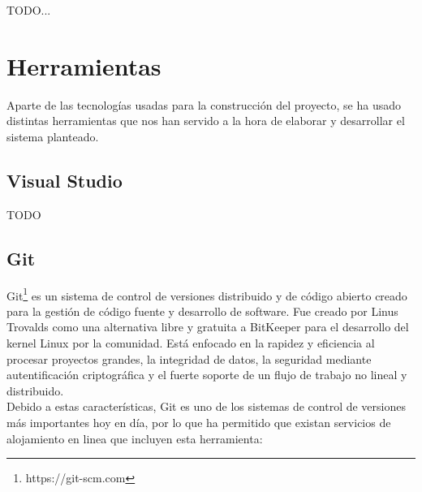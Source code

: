 TODO...

\section{Herramientas}

Aparte de las tecnologías usadas para la construcción del proyecto, se ha usado distintas herramientas que nos han servido a la hora de elaborar y desarrollar el sistema planteado.

\subsection{Visual Studio}

TODO

\subsection{Git}

Git\footnote{https://git-scm.com} es un sistema de control de versiones distribuido y de código abierto creado para la gestión de código fuente y desarrollo de software. Fue creado por Linus Trovalds como una alternativa libre y gratuita a BitKeeper para el desarrollo del kernel Linux por la comunidad. Está enfocado en la rapidez y eficiencia al procesar proyectos grandes, la integridad de datos, la seguridad mediante autentificación criptográfica y el fuerte soporte de un flujo de trabajo no lineal y distribuido. \\

Debido a estas características, Git es uno de los sistemas de control de versiones más importantes hoy en día, por lo que ha permitido que existan servicios de alojamiento en linea que incluyen esta herramienta:

